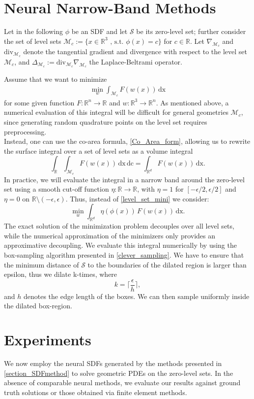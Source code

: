 \documentclass[12pt,openany]{book}
\newcommand{\R}{\mathbb{R}}
\def\S{\mathcal{S}}
\theoremstyle{plainnormal}
\theoremstyle{remark}
\begin{document}
\section{Neural Narrow-Band Methods}
Let in the following $\phi$ be an SDF and let $\S$ be its zero-level set; further consider the set of level sets $\mathcal{M}_c := \{x\in \R^3 \text{ , s.t. } \phi(x) = c\}$ for $c \in \R$. Let $\nabla_{\mathcal{M}_c}$ and $\mathrm{div}_{\mathcal{M}_c}$ denote the tangential gradient and divergence with respect to the level set $\mathcal M_c$, and $\Delta_{\mathcal M_c} := \mathrm{div}_{\mathcal{M}_c}\nabla_{\mathcal{M}_c} $ the Laplace-Beltrami operator.\par
Assume that we want to minimize \begin{align}\label{level_set_mini}
    \min_w\int_{\mathcal{M}_c} F(w(x)) \,\mathrm{dx}
\end{align} for some given function $F:\R^n \rightarrow\R$ and $w: \R^3 \rightarrow\R^n$. As mentioned above, a numerical evaluation of this integral will be difficult for general geometries $\mathcal M_c$, since generating random quadrature points on the level set requires preprocessing. \\
Instead, one can use the co-area formula, \cref{Co_Area_form}, allowing us to rewrite the surface integral over a set of level sets as a volume integral
$$\int_\R\int_{\mathcal{M}_c} F(w(x)) \,\mathrm{dx}\,\mathrm{dc}= \int_{\R^d}F(w(x)) \,\mathrm{dx}.$$
In practice, we will evaluate the integral in a narrow band around the zero-level set using a smooth cut-off function $\eta: \R\rightarrow\R$, with $\eta = 1$ for $[-\epsilon/2,\epsilon/2]$ and $\eta = 0$ on $\R \setminus(-\epsilon, \epsilon)$. Thus, instead of \cref{level_set_mini} we consider: 
$$\min_w \int_{\R^d} \eta(\phi(x))\,F(w(x))  \,\mathrm{dx}.$$
The exact solution of the minimization problem decouples over all level sets, while the numerical approximation of the minimizers only provides an approximative decoupling.
We evaluate this integral numerically by using the box-sampling algorithm presented in \cref{clever_sampling}. We have to ensure that the minimum distance of $\S$ to the boundaries of the dilated region is larger than epsilon, thus we dilate k-times, where $$k = \Big\lceil\frac{\epsilon}{h}\Big\rceil,$$
and $h$ denotes the edge length of the boxes. We can then sample uniformly inside the dilated box-region.
\section{Experiments}
We now employ the neural SDFs generated by the methods presented in \cref{section_SDFmethod} to solve geometric PDEs on the zero-level sets. In the absence of comparable neural methods, we evaluate our results against ground truth solutions or those obtained via finite element methods.
\end{document}
